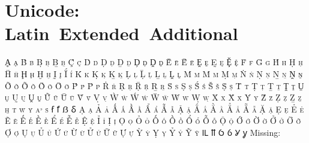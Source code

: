 

\presection\section*{\checkno Unicode: Latin~Extended~Additional}\postsection

\textsc{Ḁ ḁ Ḃ ḃ Ḅ ḅ Ḇ ḇ Ḉ ḉ Ḋ ḋ Ḍ ḍ Ḏ ḏ
Ḑ ḑ Ḓ ḓ Ḕ ḕ Ḗ ḗ Ḙ ḙ Ḛ ḛ Ḝ ḝ Ḟ ḟ
Ḡ ḡ Ḣ ḣ Ḥ ḥ Ḧ ḧ Ḩ ḩ Ḫ ḫ Ḭ ḭ Ḯ ḯ
Ḱ ḱ Ḳ ḳ Ḵ ḵ Ḷ ḷ Ḹ ḹ Ḻ ḻ Ḽ ḽ Ḿ ḿ
Ṁ ṁ Ṃ ṃ Ṅ ṅ Ṇ ṇ Ṉ ṉ Ṋ ṋ Ṍ ṍ Ṏ ṏ
Ṑ ṑ Ṓ ṓ Ṕ ṕ Ṗ ṗ Ṙ ṙ Ṛ ṛ Ṝ ṝ Ṟ ṟ
Ṡ ṡ Ṣ ṣ Ṥ ṥ Ṧ ṧ Ṩ ṩ Ṫ ṫ Ṭ ṭ Ṯ ṯ
Ṱ ṱ Ṳ ṳ Ṵ ṵ Ṷ ṷ Ṹ ṹ Ṻ ṻ Ṽ ṽ Ṿ ṿ
Ẁ ẁ Ẃ ẃ Ẅ ẅ Ẇ ẇ Ẉ ẉ Ẋ ẋ Ẍ ẍ Ẏ ẏ
Ẑ ẑ Ẓ ẓ Ẕ ẕ ẖ ẗ ẘ ẙ ẚ ẛ ẜ ẝ ẞ ẟ
Ạ ạ Ả ả Ấ ấ Ầ ầ Ẩ ẩ Ẫ ẫ Ậ ậ Ắ ắ
Ằ ằ Ẳ ẳ Ẵ ẵ Ặ ặ Ẹ ẹ Ẻ ẻ Ẽ ẽ Ế ế
Ề ề Ể ể Ễ ễ Ệ ệ Ỉ ỉ Ị ị Ọ ọ Ỏ ỏ
Ố ố Ồ ồ Ổ ổ Ỗ ỗ Ộ ộ Ớ ớ Ờ ờ Ở ở
Ỡ ỡ Ợ ợ Ụ ụ Ủ ủ Ứ ứ Ừ ừ Ử ử Ữ ữ
Ự ự Ỳ ỳ Ỵ ỵ Ỷ ỷ Ỹ ỹ Ỻ ỻ Ỽ ỽ Ỿ ỿ}
\hfill Missing: 